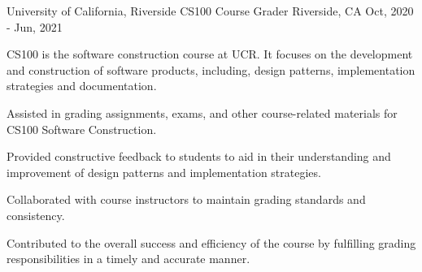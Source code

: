 \cventry
{University of California, Riverside} %
{CS100 Course Grader} %
{Riverside, CA}
{Oct, 2020 - Jun, 2021}
{
	CS100 is the software construction course at UCR. It focuses on the development and construction of software products, including, design patterns, implementation strategies and documentation.
	\begin{cvitems} %
		\item {Assisted in grading assignments, exams, and other course-related materials for CS100 Software Construction.}
		\item {Provided constructive feedback to students to aid in their understanding and improvement of design patterns and implementation strategies.}
		\item {Collaborated with course instructors to maintain grading standards and consistency.}
		\item {Contributed to the overall success and efficiency of the course by fulfilling grading responsibilities in a timely and accurate manner.}
	\end{cvitems}
}
